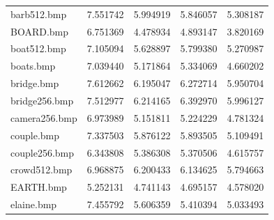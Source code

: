 \documentclass{article}
\begin{document}
\begin{table}[H]
\begin{adjustbox}{center}
\begin{tabular}{lrrrr}
    barb512.bmp        & 7.551742                     & 5.994919                               & 5.846057                                  & 5.308187                                   \\
    BOARD.bmp          & 6.751369                     & 4.478934                               & 4.893147                                  & 3.820169                                   \\
    boat512.bmp        & 7.105094                     & 5.628897                               & 5.799380                                  & 5.270987                                   \\
    boats.bmp          & 7.039440                     & 5.171864                               & 5.334069                                  & 4.660202                                   \\
    bridge.bmp         & 7.612662                     & 6.195047                               & 6.272714                                  & 5.950704                                   \\
    bridge256.bmp      & 7.512977                     & 6.214165                               & 6.392970                                  & 5.996127                                   \\
    camera256.bmp      & 6.973989                     & 5.151811                               & 5.224229                                  & 4.781324                                   \\
    couple.bmp         & 7.337503                     & 5.876122                               & 5.893505                                  & 5.109491                                   \\
    couple256.bmp      & 6.343808                     & 5.386308                               & 5.370506                                  & 4.615757                                   \\
    crowd512.bmp       & 6.968875                     & 6.200433                               & 6.134625                                  & 5.794663                                   \\
    EARTH.bmp          & 5.252131                     & 4.741143                               & 4.695157                                  & 4.578020                                   \\
    elaine.bmp         & 7.455792                     & 5.606359                               & 5.410394                                  & 5.033493                                   \\

\end{tabular}
\end{adjustbox}
\end{table}
\end{document}
